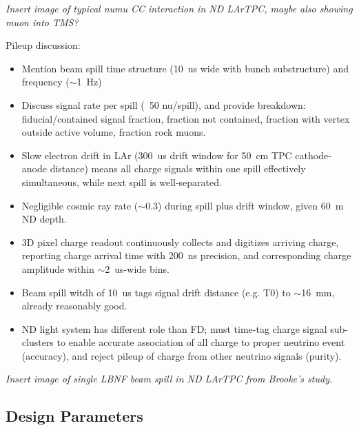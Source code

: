 {\it Insert image of typical numu CC interaction in ND LArTPC, maybe also showing muon into TMS?}

Pileup discussion:
\begin{itemize}
    \item Mention beam spill time structure (10~us wide with bunch substructure) and frequency ($\sim$1~Hz)
    \item Discuss signal rate per spill (~50 nu/spill), and provide breakdown: fiducial/contained signal fraction, fraction not contained, fraction with vertex outside active volume, fraction rock muons.
    \item Slow electron drift in LAr (300~us drift window for 50~cm TPC cathode-anode distance) means all charge signals within one spill effectively simultaneous, while next spill is well-separated.
    \item Negligible cosmic ray rate ($\sim$0.3) during spill plus drift window, given 60~m ND depth.
    \item 3D pixel charge readout continuously collects and digitizes arriving charge, reporting charge arrival time with 200~ns precision, and corresponding charge amplitude within $\sim$2~us-wide bins.
    \item Beam spill witdh of 10~us tags signal drift distance (e.g. T0) to $\sim$16~mm, already reasonably good.  
    \item ND light system has different role than FD; must time-tag charge signal sub-clusters to enable accurate association of all charge to proper neutrino event (accuracy), and reject pileup of charge from other neutrino signals (purity).
\end{itemize}

{\it Insert image of single LBNF beam spill in ND LArTPC from Brooke's study.}
 
\subsection{Design Parameters}
\label{sec:lartpc-ovvw-param}

